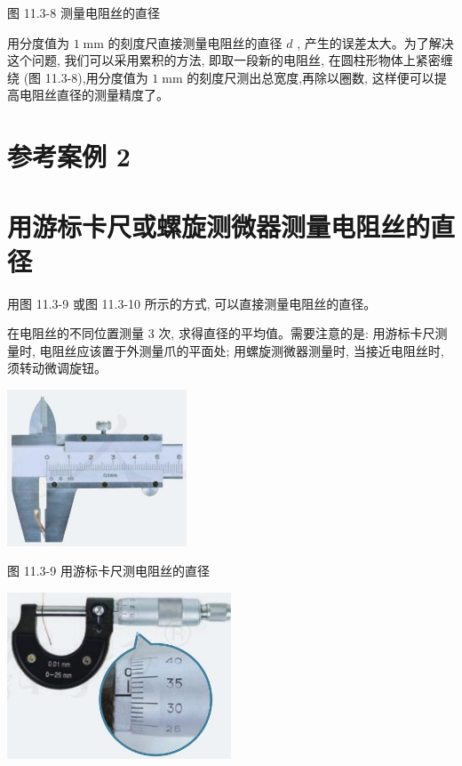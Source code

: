 \documentclass[10pt]{article}
\begin{document}
图 11.3-8 测量电阻丝的直径

用分度值为 \(1\mathrm{\;{mm}}\) 的刻度尺直接测量电阻丝的直径 \(d\) , 产生的误差太大。为了解决这个问题, 我们可以采用累积的方法, 即取一段新的电阻丝, 在圆柱形物体上紧密缠绕 (图 11.3-8),用分度值为 \(1\mathrm{\;{mm}}\) 的刻度尺测出总宽度,再除以圈数, 这样便可以提高电阻丝直径的测量精度了。

\section*{参考案例 2}

\section*{用游标卡尺或螺旋测微器测量电阻丝的直径}

用图 11.3-9 或图 11.3-10 所示的方式, 可以直接测量电阻丝的直径。

在电阻丝的不同位置测量 3 次, 求得直径的平均值。需要注意的是: 用游标卡尺测量时, 电阻丝应该置于外测量爪的平面处; 用螺旋测微器测量时, 当接近电阻丝时, 须转动微调旋钮。

\begin{center}
\includegraphics[max width=0.4\textwidth]{images/01911d5f-8e38-70c0-b5b8-2b399bd115b6_71_581289.jpg}
\end{center}

图 11.3-9 用游标卡尺测电阻丝的直径

\begin{center}
\includegraphics[max width=0.5\textwidth]{images/01911d5f-8e38-70c0-b5b8-2b399bd115b6_71_210721.jpg}
\end{center}
\end{document}
